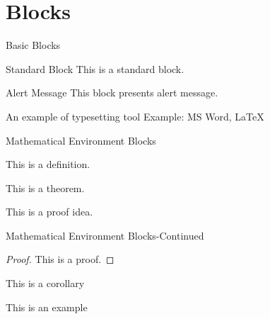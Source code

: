 
% 

\section{Blocks}
\label{sec:blocks}
\frame[plain]{\sectionpage}


\begin{frame}{Basic Blocks}
    \begin{block}{Standard Block}
        This is a standard block.
    \end{block}
    \begin{alertblock}{Alert Message}
        This block presents alert message.
    \end{alertblock}
    \begin{exampleblock}{An example of typesetting tool}
        Example: MS Word, \LaTeX{}
    \end{exampleblock}
\end{frame}


\begin{frame}{Mathematical Environment Blocks}
    \begin{definition} 
        This is a definition.
    \end{definition}
    \begin{theorem} 
        This is a theorem. 
    \end{theorem}
    \begin{lemma} 
        This is a proof idea.
    \end{lemma}
\end{frame}


\begin{frame}{Mathematical Environment Blocks-Continued}
    \begin{proof} 
        This is a proof. 
    \end{proof}
    \begin{corollary}
        This is a corollary
    \end{corollary}
    \begin{example}
        This is an example 
    \end{example}
\end{frame}